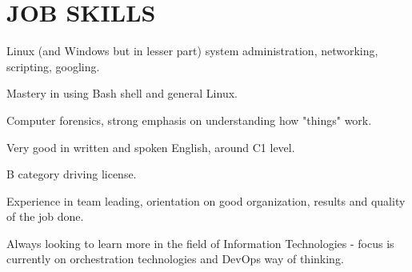 \documentclass{cv}
\begin{document}
\section{JOB SKILLS}
Linux (and Windows but in lesser part) system administration, networking, scripting, googling.

Mastery in using Bash shell and general Linux.

Computer forensics, strong emphasis on understanding how "things" work.

Very good in written and spoken English, around C1 level.

B category driving license.

Experience in team leading, orientation on good organization, results and quality of the job done.

Always looking to learn more in the field of Information Technologies - focus is currently on orchestration technologies and DevOps way of thinking.
\end{document}
